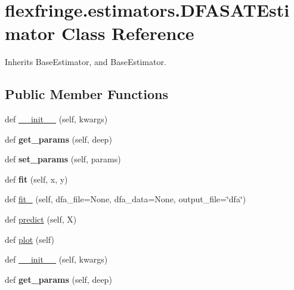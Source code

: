 \hypertarget{classflexfringe_1_1estimators_1_1_d_f_a_s_a_t_estimator}{}\section{flexfringe.\+estimators.\+D\+F\+A\+S\+A\+T\+Estimator Class Reference}
\label{classflexfringe_1_1estimators_1_1_d_f_a_s_a_t_estimator}


Inherits Base\+Estimator, and Base\+Estimator.

\subsection*{Public Member Functions}
\begin{DoxyCompactItemize}
\item 
def \hyperlink{classflexfringe_1_1estimators_1_1_d_f_a_s_a_t_estimator_a2928043898cc9db681bc8d92cfa8cd48}{\+\_\+\+\_\+init\+\_\+\+\_\+} (self, kwargs)
\item 
def {\bfseries get\+\_\+params} (self, deep)\hypertarget{classflexfringe_1_1estimators_1_1_d_f_a_s_a_t_estimator_a12a8d29e94b18d52c8474622546ce40b}{}\label{classflexfringe_1_1estimators_1_1_d_f_a_s_a_t_estimator_a12a8d29e94b18d52c8474622546ce40b}

\item 
def {\bfseries set\+\_\+params} (self, params)\hypertarget{classflexfringe_1_1estimators_1_1_d_f_a_s_a_t_estimator_af60b24aef2956574069b231b73769ce1}{}\label{classflexfringe_1_1estimators_1_1_d_f_a_s_a_t_estimator_af60b24aef2956574069b231b73769ce1}

\item 
def {\bfseries fit} (self, x, y)\hypertarget{classflexfringe_1_1estimators_1_1_d_f_a_s_a_t_estimator_a0c8baa70692a96c59ccfb6b93646c8a4}{}\label{classflexfringe_1_1estimators_1_1_d_f_a_s_a_t_estimator_a0c8baa70692a96c59ccfb6b93646c8a4}

\item 
def \hyperlink{classflexfringe_1_1estimators_1_1_d_f_a_s_a_t_estimator_a6e504f1468b7f3617dac5c3552137f83}{fit\+\_\+} (self, dfa\+\_\+file=None, dfa\+\_\+data=None, output\+\_\+file=\char`\"{}dfa\char`\"{})
\item 
def \hyperlink{classflexfringe_1_1estimators_1_1_d_f_a_s_a_t_estimator_a0f3e5a09ad107352e7d0c92e1a19ae7d}{predict} (self, X)
\item 
def \hyperlink{classflexfringe_1_1estimators_1_1_d_f_a_s_a_t_estimator_aea42a1d82c30007acc257a4d4e587f12}{plot} (self)
\item 
def \hyperlink{classflexfringe_1_1estimators_1_1_d_f_a_s_a_t_estimator_a2928043898cc9db681bc8d92cfa8cd48}{\+\_\+\+\_\+init\+\_\+\+\_\+} (self, kwargs)
\item 
def {\bfseries get\+\_\+params} (self, deep)\hypertarget{classflexfringe_1_1estimators_1_1_d_f_a_s_a_t_estimator_a12a8d29e94b18d52c8474622546ce40b}{}\label{classflexfringe_1_1estimators_1_1_d_f_a_s_a_t_estimator_a12a8d29e94b18d52c8474622546ce40b}


\end{DoxyCompactItemize}
